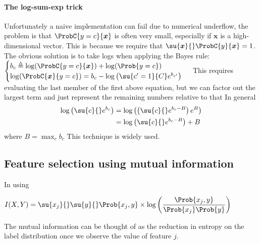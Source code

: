 \paragraph{The log-sum-exp trick}
Unfortunately a naive implementation can fail due to numerical underflow, the problem is 
that $\ProbC{y=c}{\bm{x}}$ is often very small, especially if $\bm{x}$ is a 
high-dimensional vector. This is because we require that $\su{\bm{x}}{}\ProbC{y}{\bm{x}}
= 1$.\\ 
The obvious solution is to take logs when applying the Bayes rule:
$\begin{cases}
    b_{c} \triangleq \log(\ProbC{y=c}{\bm{x}}) + \log(\Prob{y=c})\\
    \log(\ProbC{\bm{x}}{y=c}) = b_{c} - \log\left(\su{c'=1}{C}e^{b_{c'}}\right)
\end{cases}$
This requires evaluating the last member of the first above equation, but we can factor
out the largest term and just represent the remaining numbers relative to that
In general 
\begin{align*}
    \log \left(\su{c}{}e^{b_{c}}\right) 
    &=  \log \left(\left(\su{c}{}e^{b_{c} - B}\right)e^{B}\right)\\
    &=  \log \left(\su{c}{}e^{b_{c} - B}\right) + B
\end{align*}
where $B = \max_{c}b_{c}$
This technique is widely used.


\subsection{Feature selection using mutual information}
In using 
\begin{center}
    $I(X, Y) = \su{x_{j}}{}\su{y}{}\Prob{x_{j}, y}\times
    \log \left(\dfrac{\Prob{x_{j}, y}}{\Prob{x_{j}}\Prob{y}}\right)$
\end{center}
The mutual information can be thought of as the reduction in entropy on the label 
distribution once we observe the value of feature $j$.


